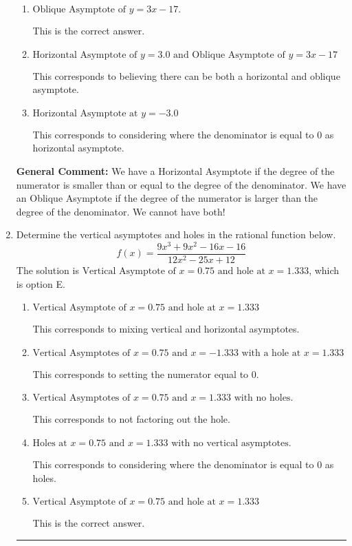 \documentclass{extbook}[14pt]
\newcommand{\litem}[1]{\item #1

\rule{\textwidth}{0.4pt}}
\begin{document}
\begin{enumerate}
{\begin{enumerate}[label=\Alph*.]
This corresponds to using rule for Horizontal Asymptote when degree of numerator and denominator match.
\item \( \text{Oblique Asymptote of } y = 3x -17. \)

This is the correct answer.
\item \( \text{Horizontal Asymptote of } y = 3.0 \text{ and Oblique Asymptote of } y = 3x -17 \)

This corresponds to believing there can be both a horizontal and oblique asymptote.
\item \( \text{Horizontal Asymptote at } y = -3.0 \)

This corresponds to considering where the denominator is equal to 0 as horizontal asymptote.
\end{enumerate}

\textbf{General Comment:} We have a Horizontal Asymptote if the degree of the numerator is smaller than or equal to the degree of the denominator. We have an Oblique Asymptote if the degree of the numerator is larger than the degree of the denominator. We cannot have both!
}
\litem{
Determine the vertical asymptotes and holes in the rational function below.
\[ f(x) = \frac{9x^{3} +9 x^{2} -16 x -16}{12x^{2} -25 x + 12} \]The solution is \( \text{Vertical Asymptote of } x = 0.75 \text{ and hole at } x = 1.333 \), which is option E.\begin{enumerate}[label=\Alph*.]
\item \( \text{Vertical Asymptote of } x = 0.75 \text{ and hole at } x = 1.333 \)

This corresponds to mixing vertical and horizontal asymptotes.
\item \( \text{Vertical Asymptotes of } x = 0.75 \text{ and } x = -1.333 \text{ with a hole at } x = 1.333 \)

This corresponds to setting the numerator equal to 0.
\item \( \text{Vertical Asymptotes of } x = 0.75 \text{ and } x = 1.333 \text{ with no holes.} \)

This corresponds to not factoring out the hole.
\item \( \text{Holes at } x = 0.75 \text{ and } x = 1.333 \text{ with no vertical asymptotes.} \)

This corresponds to considering where the denominator is equal to 0 as holes.
\item \( \text{Vertical Asymptote of } x = 0.75 \text{ and hole at } x = 1.333 \)

This is the correct answer.
\end{enumerate}

}
\end{enumerate}
\end{document}
